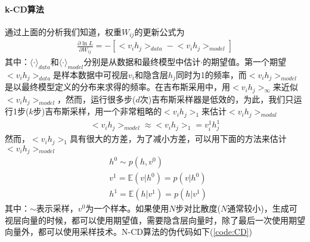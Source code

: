             \paragraph{k-CD算法}通过上面的分析我们知道，权重$W_{ij}$的更新公式为
            \begin{align*}
            \frac{\partial \ln L}{\partial W_{ij}} = - \left[ \big< v_ih_j \big>_{data} -\big< v_ih_j \big>_{model}\right]
            \end{align*}
            其中：$\langle \cdot \rangle_{data}$和$\langle \cdot \rangle_{model}$分别是从数据和最终模型中估计$\cdot$的期望值。第一个期望$\big< v_ih_j \big>_{data}$是样本数据中可视层$v_i$和隐含层$h_j$同时为1的频率，而$\big< v_ih_j \big>_{model}$是以最终模型定义的分布来求得的频率。在吉布斯采用中，用$\big< v_ih_j \big>_{\infty}$来近似$\big< v_ih_j \big>_{model}$，然而，运行很多步($d$次)吉布斯采样器是低效的，为此，我们只运行1步($k$步)吉布斯采样，用一个非常粗略的$\big< v_ih_j \big>_{1}$来估计$\big< v_ih_j \big>_{modal}$
            \begin{align*}
            \big< v_ih_j \big>_{model} \approx \big< v_ih_j \big>_{1} = v_i^1h_j^1
            \end{align*}
            然而，$\big< v_ih_j \big>_{1}$具有很大的方差，为了减小方差，可以用下面的方法来估计$\big< v_ih_j \big>_{model}$
            \begin{align*}
            & h^0 \sim p(h,v^0)\\
            & v^1 = \mathbb{E}(v|h^0) = p(v|h^0)\\
            & h^1 = \mathbb{E}(h|v^1) = p(h|v^1)
            \end{align*}
            其中：$\sim$表示采样，$v^0$为一个样本。如果使用$N$步对比散度($N$通常较小)，生成可视层向量的时候，都可以使用期望值，需要隐含层向量时，除了最后一次使用期望向量外，都可以使用采样技术。N-CD算法的伪代码如下(\ref{code:CD})
